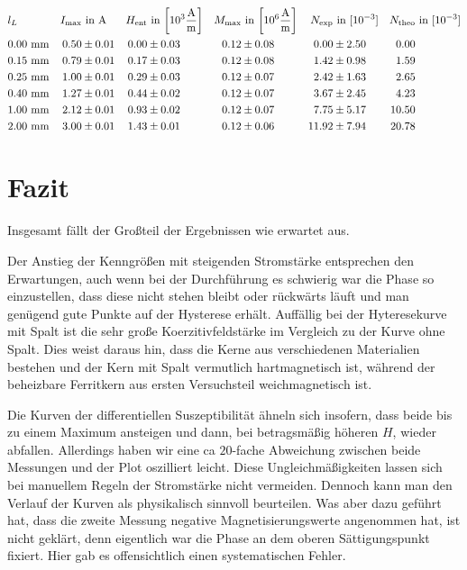 \documentclass[12pt,a4paper]{scrartcl}
\numberwithin{equation}{section} %
\begin{document}
\begin{table}
\begin{align*}
	&l_L &
		I_\mathrm{max} &\text{ in } \mathrm A &
		H_\mathrm{ent} &\text{ in }
		{\tiny \left[ 10^3 \frac{\mathrm A}{\mathrm m} \right] } &
		M_\mathrm{max} &\text{ in }
		{\tiny \left[ 10^6 \frac{\mathrm A}{\mathrm m} \right] } &
		N_\mathrm{exp} &\text{ in } [10^{-3}] &
		N_\mathrm{theo} &\text{ in } [10^{-3}]
		\\
	&0.00 \ \mathrm{mm} &
		0.50 &\pm 0.01 &
		0.00 &\pm 0.03 &
		0.12 &\pm 0.08 &
		0.00 &\pm 2.50 &
		0.00\\
	&0.15 \ \mathrm{mm} &
		0.79 &\pm 0.01 &
		0.17 &\pm 0.03 &
		0.12 &\pm 0.08 &
		1.42 &\pm 0.98 &
		1.59\\
	&0.25 \ \mathrm{mm} &
		1.00 &\pm 0.01 &
		0.29 &\pm 0.03 &
		0.12 &\pm 0.07 &
		2.42 &\pm 1.63 &
		2.65\\
	&0.40 \ \mathrm{mm} &
		1.27 &\pm 0.01 &
		0.44 &\pm 0.02 &
		0.12 &\pm 0.07 &
		3.67 &\pm 2.45 &
		4.23\\
	&1.00 \ \mathrm{mm} &
		2.12 &\pm 0.01 &
		0.93 &\pm 0.02 &
		0.12 &\pm 0.07 &
		7.75 &\pm 5.17 &
		10.50\\
	&2.00 \ \mathrm{mm} &
		3.00 &\pm 0.01 &
		1.43 &\pm 0.01 &
		0.12 &\pm 0.06 &
		11.92 &\pm 7.94 &
		20.78
\end{align*}
\caption{Entmagnetisierungsfaktor}
\label{Tab: Entmagnetisierung}
\end{table}

\clearpage
\hypertarget{fazit}{%
\section{Fazit}\label{fazit}}

Insgesamt fällt der Großteil der Ergebnissen wie erwartet aus.

Der Anstieg der Kenngrößen mit steigenden Stromstärke entsprechen den Erwartungen, auch wenn bei der Durchführung es schwierig war die Phase so einzustellen, dass diese nicht stehen bleibt oder rückwärts läuft und man genügend gute Punkte auf der Hysterese erhält. Auffällig bei der Hyteresekurve mit Spalt ist die sehr große Koerzitivfeldstärke im Vergleich zu der Kurve ohne Spalt. Dies weist daraus hin, dass die Kerne aus verschiedenen Materialien bestehen und der Kern mit Spalt vermutlich hartmagnetisch ist, während der beheizbare Ferritkern aus ersten Versuchsteil weichmagnetisch ist.

Die Kurven der differentiellen Suszeptibilität ähneln sich insofern, dass beide bis zu einem Maximum ansteigen und dann, bei betragsmäßig höheren $H$, wieder abfallen. Allerdings haben wir eine ca $20$-fache Abweichung zwischen beide Messungen und der Plot oszilliert leicht. Diese Ungleichmäßigkeiten lassen sich bei manuellem Regeln der Stromstärke nicht vermeiden. Dennoch kann man den Verlauf der Kurven als physikalisch sinnvoll beurteilen. Was aber dazu geführt hat, dass die zweite Messung negative Magnetisierungswerte angenommen hat, ist nicht geklärt, denn eigentlich war die Phase an dem oberen Sättigungspunkt fixiert. Hier gab es offensichtlich einen systematischen Fehler.
\end{document}
